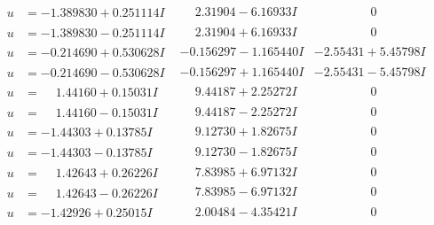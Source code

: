 \documentclass[1p]{elsarticle_modified}
\theoremstyle{definition}
\begin{document}
$$\begin{array}{c|c|c}
\begin{aligned}
u &= -1.389830 + 0.251114 I\end{aligned}
 & \phantom{-}2.31904 - 6.16933 I & \phantom{-0.000000 } 0 \\ \hline\begin{aligned}
u &= -1.389830 - 0.251114 I\end{aligned}
 & \phantom{-}2.31904 + 6.16933 I & \phantom{-0.000000 } 0 \\ \hline\begin{aligned}
u &= -0.214690 + 0.530628 I\end{aligned}
 & -0.156297 - 1.165440 I & -2.55431 + 5.45798 I \\ \hline\begin{aligned}
u &= -0.214690 - 0.530628 I\end{aligned}
 & -0.156297 + 1.165440 I & -2.55431 - 5.45798 I \\ \hline\begin{aligned}
u &= \phantom{-}1.44160 + 0.15031 I\end{aligned}
 & \phantom{-}9.44187 + 2.25272 I & \phantom{-0.000000 } 0 \\ \hline\begin{aligned}
u &= \phantom{-}1.44160 - 0.15031 I\end{aligned}
 & \phantom{-}9.44187 - 2.25272 I & \phantom{-0.000000 } 0 \\ \hline\begin{aligned}
u &= -1.44303 + 0.13785 I\end{aligned}
 & \phantom{-}9.12730 + 1.82675 I & \phantom{-0.000000 } 0 \\ \hline\begin{aligned}
u &= -1.44303 - 0.13785 I\end{aligned}
 & \phantom{-}9.12730 - 1.82675 I & \phantom{-0.000000 } 0 \\ \hline\begin{aligned}
u &= \phantom{-}1.42643 + 0.26226 I\end{aligned}
 & \phantom{-}7.83985 + 6.97132 I & \phantom{-0.000000 } 0 \\ \hline\begin{aligned}
u &= \phantom{-}1.42643 - 0.26226 I\end{aligned}
 & \phantom{-}7.83985 - 6.97132 I & \phantom{-0.000000 } 0 \\ \hline\begin{aligned}
u &= -1.42926 + 0.25015 I\end{aligned}
 & \phantom{-}2.00484 - 4.35421 I & \phantom{-0.000000 } 0 \\ \hline\begin{aligned}

\end{aligned}
\end{array}$$
\end{document}
